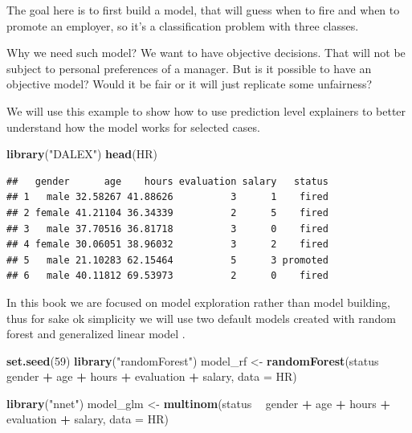 \documentclass[]{krantz}
\newenvironment{Shaded}{\begin{snugshade}}{\end{snugshade}}
\newcommand{\DataTypeTok}[1]{\textcolor[rgb]{0.13,0.29,0.53}{#1}}
\newcommand{\DecValTok}[1]{\textcolor[rgb]{0.00,0.00,0.81}{#1}}
\newcommand{\KeywordTok}[1]{\textcolor[rgb]{0.13,0.29,0.53}{\textbf{#1}}}
\newcommand{\NormalTok}[1]{#1}
\newcommand{\OperatorTok}[1]{\textcolor[rgb]{0.81,0.36,0.00}{\textbf{#1}}}
\newcommand{\StringTok}[1]{\textcolor[rgb]{0.31,0.60,0.02}{#1}}
\theoremstyle{definition}
\theoremstyle{definition}
\theoremstyle{definition}
\theoremstyle{remark}
\begin{document}
The goal here is to first build a model, that will guess when to fire
and when to promote an employer, so it's a classification problem with
three classes.

Why we need such model? We want to have objective decisions. That will
not be subject to personal preferences of a manager. But is it possible
to have an objective model? Would it be fair or it will just replicate
some unfairness?

We will use this example to show how to use prediction level explainers
to better understand how the model works for selected cases.

\begin{Shaded}
\begin{Highlighting}[]
\KeywordTok{library}\NormalTok{(}\StringTok{"DALEX"}\NormalTok{)}
\KeywordTok{head}\NormalTok{(HR)}
\end{Highlighting}
\end{Shaded}

\begin{verbatim}
##   gender      age    hours evaluation salary   status
## 1   male 32.58267 41.88626          3      1    fired
## 2 female 41.21104 36.34339          2      5    fired
## 3   male 37.70516 36.81718          3      0    fired
## 4 female 30.06051 38.96032          3      2    fired
## 5   male 21.10283 62.15464          5      3 promoted
## 6   male 40.11812 69.53973          2      0    fired
\end{verbatim}

In this book we are focused on model exploration rather than model
building, thus for sake ok simplicity we will use two default models
created with random forest \citep{R-randomForest} and generalized linear
model \citep{R-nnet}.

\begin{Shaded}
\begin{Highlighting}[]
\KeywordTok{set.seed}\NormalTok{(}\DecValTok{59}\NormalTok{)}
\KeywordTok{library}\NormalTok{(}\StringTok{"randomForest"}\NormalTok{)}
\NormalTok{model_rf <-}\StringTok{ }\KeywordTok{randomForest}\NormalTok{(status }\OperatorTok{~}\StringTok{ }\NormalTok{gender }\OperatorTok{+}\StringTok{ }\NormalTok{age }\OperatorTok{+}\StringTok{ }\NormalTok{hours }\OperatorTok{+}\StringTok{ }\NormalTok{evaluation }\OperatorTok{+}\StringTok{ }\NormalTok{salary, }\DataTypeTok{data =}\NormalTok{ HR)}

\KeywordTok{library}\NormalTok{(}\StringTok{"nnet"}\NormalTok{)}
\NormalTok{model_glm <-}\StringTok{ }\KeywordTok{multinom}\NormalTok{(status }\OperatorTok{~}\StringTok{ }\NormalTok{gender }\OperatorTok{+}\StringTok{ }\NormalTok{age }\OperatorTok{+}\StringTok{ }\NormalTok{hours }\OperatorTok{+}\StringTok{ }\NormalTok{evaluation }\OperatorTok{+}\StringTok{ }\NormalTok{salary, }\DataTypeTok{data =}\NormalTok{ HR)}
\end{Highlighting}
\end{Shaded}
\end{document}
